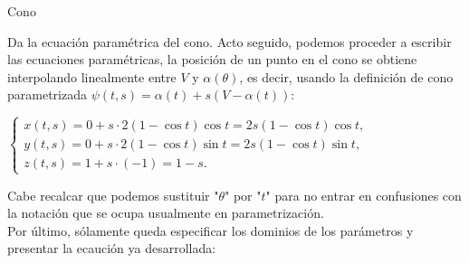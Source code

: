 \documentclass[11pt,letterpaper]{article}
\begin{document}
\begin{inciso}{Cono}
\begin{problema}{Da la ecuación paramétrica del cono.}
Acto seguido, podemos proceder a escribir las ecuaciones paramétricas, la posición de un punto en el cono se obtiene interpolando linealmente entre $V$ y $\alpha(\theta)$, es decir, usando la definición de cono parametrizada $\psi (t,s)= \alpha (t) + s(V-\alpha(t))$:

\begin{center}
    
    $
    \begin{cases}
        x( t, s) = 0 + s \cdot 2(1 - \cos t)\cos t = 2s(1 - \cos t)\cos t, \\
        y( t, s) = 0 + s \cdot 2(1 - \cos t)\sin t = 2s(1 - \cos t)\sin t, \\
        z( t, s) = 1 + s \cdot (-1) = 1 - s.
    \end{cases}
    $
    
\end{center}

Cabe recalcar que podemos sustituir "$\theta$" por "$t$" para no entrar en confusiones con la notación que se ocupa usualmente en parametrización. \\
Por último, sólamente queda especificar los dominios de los parámetros y presentar la ecaución ya desarrollada: 
\\\\
\boxed{
\begin{minipage}{0.25\textwidth} 
    \begin{equation*}  
        \begin{split}
            &\psi: [0, 2\pi) \times \mathbb{R} \rightarrow \mathbb{R}^3, \\
            &t \longmapsto [0, 2\pi), \\
            &s \longmapsto \mathbb{R}.
        \end{split}
    \end{equation*} 
    \end{minipage}%
    \begin{minipage}{0.75\textwidth} 
        \begin{center}
            $ \psi (t,s)=
            \begin{cases}
                x( t , s) = 2s(1 - \cos t )\cos t , \\
                y( t , s) = 2s(1 - \cos t )\sin t , \\
                z( t , s) = 1 - s,
            \end{cases} \quad \text{con }  t  \in [0, 2\pi), \ s \in \mathbb{R}.
            $
        \end{center}
    \end{minipage}
}


\end{problema}
\end{inciso}
\end{document}
